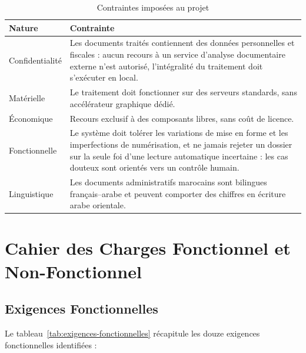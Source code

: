 \begin{table}[H]
\centering
\caption{Contraintes imposées au projet}
\label{tab:contraintes}
\small
\begin{tabular}{|p{3.2cm}|p{9.2cm}|}
\hline
\textbf{Nature} & \textbf{Contrainte} \\
\hline
Confidentialité & Les documents traités contiennent des données personnelles et
fiscales : aucun recours à un service d'analyse documentaire externe n'est
autorisé, l'intégralité du traitement doit s'exécuter en local. \\
\hline
Matérielle & Le traitement doit fonctionner sur des serveurs standards, sans
accélérateur graphique dédié. \\
\hline
Économique & Recours exclusif à des composants libres, sans coût de licence. \\
\hline
Fonctionnelle & Le système doit tolérer les variations de mise en forme et les
imperfections de numérisation, et ne jamais rejeter un dossier sur la seule foi
d'une lecture automatique incertaine : les cas douteux sont orientés vers un
contrôle humain. \\
\hline
Linguistique & Les documents administratifs marocains sont bilingues
français--arabe et peuvent comporter des chiffres en écriture arabe orientale. \\
\hline
\end{tabular}
\end{table}



\section{Cahier des Charges Fonctionnel et Non-Fonctionnel}

\subsection{Exigences Fonctionnelles}

Le tableau~\ref{tab:exigences-fonctionnelles} r\'{e}capitule les douze exigences fonctionnelles identifi\'{e}es :

